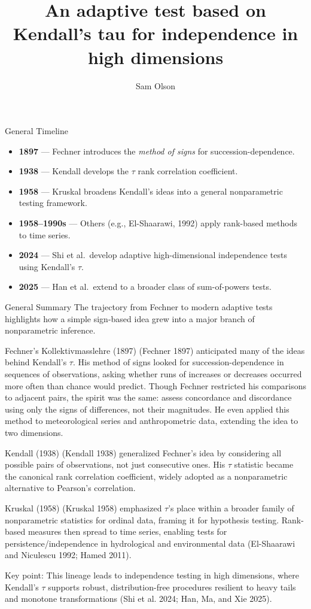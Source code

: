 \documentclass[
  ignorenonframetext,
]{beamer}
\title{An adaptive test based on Kendall's tau for independence in high
dimensions}
\author{Sam Olson}
\date{}
\providecommand{\tightlist}{%
  \setlength{\itemsep}{0pt}\setlength{\parskip}{0pt}}
\begin{document}
\frame{\titlepage}

\begin{frame}{General Timeline}
\label{general-timeline}
\begin{itemize}
\tightlist
\item
  \textbf{1897} --- Fechner introduces the \emph{method of signs} for
  succession-dependence.
\item
  \textbf{1938} --- Kendall develops the \(\tau\) rank correlation
  coefficient.
\item
  \textbf{1958} --- Kruskal broadens Kendall's ideas into a general
  nonparametric testing framework.
\item
  \textbf{1958--1990s} --- Others (e.g., El-Shaarawi, 1992) apply
  rank-based methods to time series.
\item
  \textbf{2024} --- Shi et al.~develop adaptive high-dimensional
  independence tests using Kendall's \(\tau\).
\item
  \textbf{2025} --- Han et al.~extend to a broader class of
  sum-of-powers tests.
\end{itemize}
\end{frame}

\begin{frame}[allowframebreaks]{General Summary}
\label{general-summary}
The trajectory from Fechner to modern adaptive tests highlights how a
simple sign-based idea grew into a major branch of nonparametric
inference.

Fechner's Kollektivmasslehre (1897) (Fechner 1897) anticipated many of
the ideas behind Kendall's \(\tau\). His method of signs looked for
succession-dependence in sequences of observations, asking whether runs
of increases or decreases occurred more often than chance would predict.
Though Fechner restricted his comparisons to adjacent pairs, the spirit
was the same: assess concordance and discordance using only the signs of
differences, not their magnitudes. He even applied this method to
meteorological series and anthropometric data, extending the idea to two
dimensions.

Kendall (1938) (Kendall 1938) generalized Fechner's idea by considering
all possible pairs of observations, not just consecutive ones. His
\(\tau\) statistic became the canonical rank correlation coefficient,
widely adopted as a nonparametric alternative to Pearson's correlation.

Kruskal (1958) (Kruskal 1958) emphasized \(\tau\)'s place within a
broader family of nonparametric statistics for ordinal data, framing it
for hypothesis testing. Rank-based measures then spread to time series,
enabling tests for persistence/independence in hydrological and
environmental data (El-Shaarawi and Niculescu 1992; Hamed 2011).

Key point: This lineage leads to independence testing in high
dimensions, where Kendall's \(\tau\) supports robust, distribution-free
procedures resilient to heavy tails and monotone transformations (Shi et
al. 2024; Han, Ma, and Xie 2025).
\end{frame}
\end{document}
